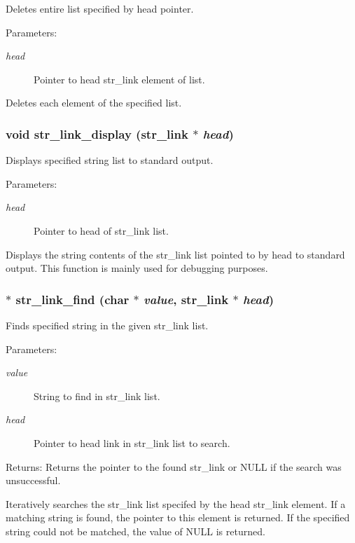 Deletes entire list specified by head pointer.

\begin{Desc}
\item[Parameters:]
\begin{description}
\item[{\em head}]Pointer to head str\_\-link element of list.\end{description}
\end{Desc}
Deletes each element of the specified list. 
\subsubsection{\setlength{\rightskip}{0pt plus 5cm}void str\_\-link\_\-display ({\bf str\_\-link} $\ast$ {\em head})}\label{link_8c_a6}


Displays specified string list to standard output.

\begin{Desc}
\item[Parameters:]
\begin{description}
\item[{\em head}]Pointer to head of str\_\-link list.\end{description}
\end{Desc}
Displays the string contents of the str\_\-link list pointed to by head to standard output. This function is mainly used for debugging purposes. 
\subsubsection{$\ast$ str\_\-link\_\-find (char $\ast$ {\em value}, {\bf str\_\-link} $\ast$ {\em head})}\label{link_8c_a11}


Finds specified string in the given str\_\-link list.

\begin{Desc}
\item[Parameters:]
\begin{description}
\item[{\em value}]String to find in str\_\-link list. \item[{\em head}]Pointer to head link in str\_\-link list to search. \end{description}
\end{Desc}
\begin{Desc}
\item[Returns:]Returns the pointer to the found str\_\-link or NULL if the search was unsuccessful.\end{Desc}
Iteratively searches the str\_\-link list specifed by the head str\_\-link element. If a matching string is found, the pointer to this element is returned. If the specified string could not be matched, the value of NULL is returned. 
